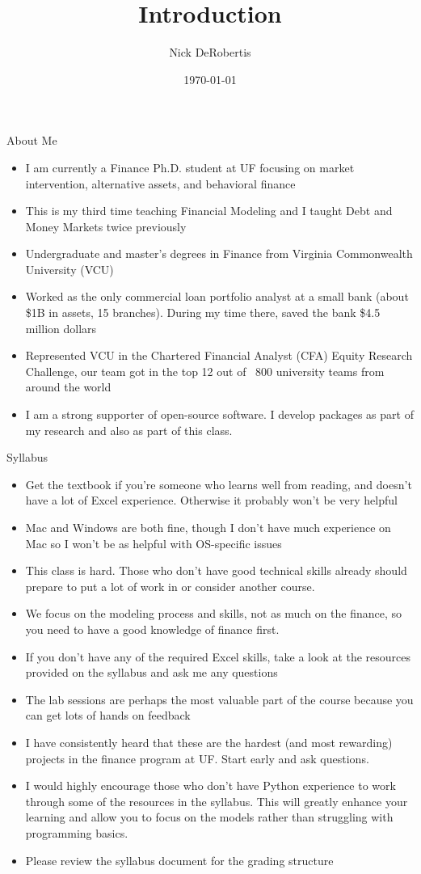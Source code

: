 \documentclass[]{article}
\begin{document}
\title{Introduction}
\author{Nick DeRobertis}
\date{\today}
\maketitle
\begin{section}{About Me}
\begin{itemize}
\item I am currently a Finance Ph.D. student at UF focusing on market intervention, alternative assets, and behavioral finance
\item This is my third time teaching Financial Modeling and I taught Debt and Money Markets twice previously
\item Undergraduate and master's degrees in Finance from Virginia Commonwealth University (VCU)
\item Worked as the only commercial loan portfolio analyst at a small bank (about \$1B in assets, 15 branches). During my time there, saved the bank \$4.5 million dollars
\item Represented VCU in the Chartered Financial Analyst (CFA) Equity Research Challenge, our team got in the top 12 out of ~800 university teams from around the world
\item I am a strong supporter of open-source software. I develop packages as part of my research and also as part of this class.
\end{itemize}
\end{section}
\begin{section}{Syllabus}
\begin{itemize}
\item Get the textbook if you're someone who learns well from reading, and doesn't have a lot of Excel experience. Otherwise it probably won't be very helpful
\item Mac and Windows are both fine, though I don't have much experience on Mac so I won't be as helpful with OS-specific issues
\item This class is hard. Those who don't have good technical skills already should prepare to put a lot of work in or consider another course.
\item We focus on the modeling process and skills, not as much on the finance, so you need to have a good knowledge of finance first.
\item If you don't have any of the required Excel skills, take a look at the resources provided on the syllabus and ask me any questions
\item The lab sessions are perhaps the most valuable part of the course because you can get lots of hands on feedback
\item I have consistently heard that these are the hardest (and most rewarding) projects in the finance program at UF. Start early and ask questions.
\item I would highly encourage those who don't have Python experience to work through some of the resources in the syllabus. This will greatly enhance your learning and allow you to focus on the models rather than struggling with programming basics.
\item Please review the syllabus document for the grading structure
\end{itemize}
\end{section}
\end{document}
